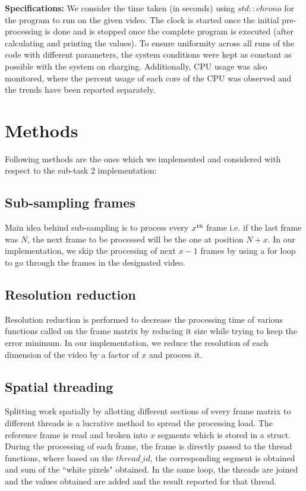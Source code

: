 \documentclass{article}
\begin{document}
\textbf{Specifications:}
We consider the time taken (in seconds) using $std::chrono$ for the program to run on the given video. The clock is started once the initial pre-processing is done and is stopped once the complete program is executed (after calculating and printing the values). To ensure uniformity across all runs of the code with different parameters, the system conditions were kept as constant as possible with the system on charging. Additionally, CPU usage was also monitored, where the percent usage of each core of the CPU was observed and the trends have been reported separately.


\section{Methods}
Following methods are the ones which we implemented and considered with respect to the sub-task 2 implementation:

\subsection{Sub-sampling frames}
Main idea behind sub-sampling is to process every $x\textsuperscript{th}$ frame i.e. if the last frame was $N$, the next frame to be processed will be the one at position $N+x$. In our implementation, we skip the processing of next $x-1$ frames by using a for loop to go through the frames in the designated video.

\subsection{Resolution reduction}
Resolution reduction is performed to decrease the processing time of various functions called on the frame matrix by reducing it size while trying to keep the error minimum. In our implementation, we reduce the resolution of each dimension of the video by a factor of $x$ and process it.

\subsection{Spatial threading}
Splitting work spatially by allotting different sections of every frame matrix to different threads is a lucrative method to spread the processing load. The reference frame is read and broken into $x$ segments which is stored in a struct. During the processing of each frame, the frame is directly passed to the thread functions, where based on the $thread\_id$, the corresponding segment is obtained and sum of the ``white pixels" obtained. In the same loop, the threads are joined and the values obtained are added and the result reported for that thread.
\end{document}
